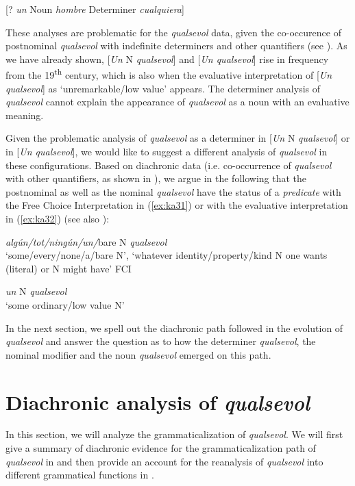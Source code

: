 \documentclass[output=paper,colorlinks,citecolor=brown]{langscibook}
\begin{document}
\ea \label{ex:ka30}
    [? \textit{un} Noun \textit{hombre} Determiner \textit{cualquiera}]\\
\z

These analyses are problematic for the \textit{qualsevol} data, given the co-occurence of postnominal \textit{qualsevol} with indefinite determiners and other quantifiers (see ). As we have already shown, [\textit{Un} N \textit{qualsevol}] and [\textit{Un qualsevol}] rise in frequency from the 19\textsuperscript{th} century, which is also when the evaluative interpretation of [\textit{Un qualsevol}] as ‘unremarkable/low value’ appears. The determiner analysis of \textit{qualsevol} cannot explain the appearance of \textit{qualsevol} as a noun with an evaluative meaning.

Given the problematic analysis of \textit{qualsevol} as a determiner in [\textit{Un} N \textit{qualsevol}] or in [\textit{Un qualsevol}], we would like to suggest a different analysis of \textit{qualsevol} in these configurations. Based on diachronic data (i.e. co-occurrence of \textit{qualsevol} with other quantifiers, as shown in ), we argue in the following  that the postnominal as well as the nominal \textit{qualsevol} have the status of a \textit{predicate} with the Free Choice Interpretation in (\ref{ex:ka31}) or with the evaluative interpretation in (\ref{ex:ka32}) (see also ):

\ea \label{ex:ka31}
    \textit{algún/tot/ningún/un/}bare N \textit{qualsevol}\\
    ‘some/every/none/a/bare N’, ‘whatever identity/property/kind N one wants (literal) or N might have’ FCI
    
    \ex \label{ex:ka32}
    \textit{un} N \textit{qualsevol}\\
    ‘some ordinary/low value N’
\z

In the next section, we spell out the diachronic path followed in the evolution of \textit{qualsevol} and answer the question as to how the determiner \textit{qualsevol}, the nominal modifier and the noun \textit{qualsevol} emerged on this path.


\section{Diachronic analysis of \textit{qualsevol}}\label{sec:kea6}
In this section, we will analyze the grammaticalization of \textit{qualsevol}. We will first give a summary of diachronic evidence for the grammaticalization path of \textit{qualsevol} in  and then provide an account for the reanalysis of \textit{qualsevol} into different grammatical functions in .
\end{document}
